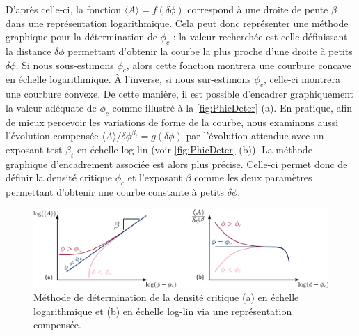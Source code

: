 \noindent D'après celle-ci, la fonction $\langle A \rangle = f(\delta\phi)$ correspond à une droite de pente $\beta$ dans une représentation logarithmique. Cela peut donc représenter une méthode graphique pour la détermination de $\phi_c$ : la valeur recherchée est celle définissant la distance $\delta\phi$ permettant d'obtenir la courbe la plus proche d'une droite à petits $\delta\phi$. Si nous sous-estimons $\phi_c$, alors cette fonction montrera une courbure concave en échelle logarithmique. \`A l'inverse, si nous sur-estimons $\phi_c$, celle-ci montrera une courbure convexe. De cette manière, il est possible d'encadrer graphiquement la valeur adéquate de $\phi_c$ comme illustré à la \autoref{fig:PhicDeter}-(a). En pratique, afin de mieux percevoir les variations de forme de la courbe, nous examinons aussi l'évolution compensée $\langle A \rangle/\delta\phi^{\beta_t} = g(\delta\phi)$ par l'évolution attendue avec un exposant test $\beta_t$ en échelle log-lin (voir \autoref{fig:PhicDeter}-(b)). La méthode graphique d'encadrement associée est alors plus précise. Celle-ci permet donc de définir la densité critique $\phi_c$ et l'exposant $\beta$ comme les deux paramètres permettant d'obtenir une courbe constante à petits $\delta\phi$.

\begin{figure}[h]
	\centering
	\includegraphics[width=\textwidth]{Chapitre2/Figures/Methodes/Phic.pdf}
	\caption{Méthode de détermination de la densité critique (a) en échelle logarithmique et (b) en échelle log-lin via une représentation compensée.}
	\label{fig:PhicDeter}
\end{figure}

